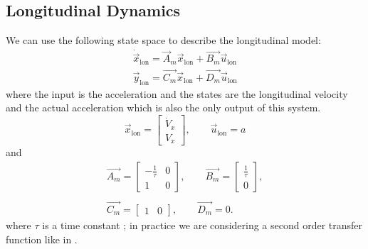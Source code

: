\subsection{Longitudinal Dynamics}
We can use the following state space to describe the longitudinal model:
\begin{equation}
\label{eqn:longi_dynamics_simple_model_ss}
\begin{array}{ll}
\dot{\vec{x}}_{\text{lon}} =\vec{A}_m \vec{x}_{\text{lon}}+ \vec{B_m}\vec{u}_{\text{lon}}\\
\vec{y}_{\text{lon}} =\vec{C_m} \vec{x}_{\text{lon}} + \vec{D_m} \vec{u}_{\text{lon}}
\end{array}
\end{equation}
where the input is the acceleration and the states are the longitudinal velocity and the actual acceleration which is also the only output of this system.
\begin{equation}
\vec{x}_{\text{lon}} = \begin{bmatrix}
\dot{V}_x\\V_x
\end{bmatrix},
\qquad
\vec{u}_{\text{lon}} = a
\end{equation}
and
\begin{equation}
\begin{array}{cc}
\vec{A_m}=\begin{bmatrix}
-\frac{1}{\tau}&0\\1&0
\end{bmatrix},
\qquad
\vec{B_m}=\begin{bmatrix}
\frac{1}{\tau}\\
0
\end{bmatrix},\\\\
\vec{C_m}=\begin{bmatrix}
1&0
\end{bmatrix}, 
\qquad
\vec{D_m}=0.
\end{array}
\end{equation}
where $\tau$ is a time constant \cite{long_tf}; in practice we are considering a second order transfer function like in \cite{longitudinal}.
